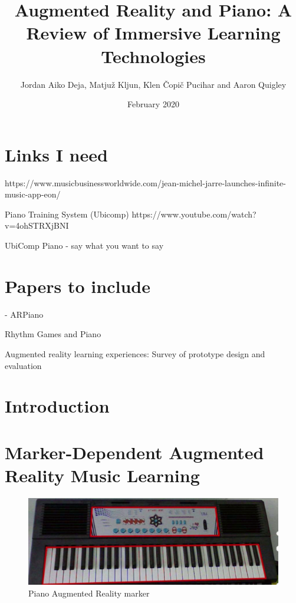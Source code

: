 \documentclass{article}
\title{Augmented Reality and Piano: A Review of Immersive Learning Technologies}
\author{Jordan Aiko Deja, Matjuž Kljun, Klen Čopič Pucihar and Aaron Quigley}
\date{February 2020}
\begin{document}
\maketitle

\section{Links I need}

https://www.musicbusinessworldwide.com/jean-michel-jarre-launches-infinite-music-app-eon/

Piano Training System (Ubicomp)
https://www.youtube.com/watch?v=4ohSTRXjBNI




UbiComp Piano - say what you want to say 
\cite{Weing:2013:PEI:2494091.2494113}


\section{Papers to include}



\cite{ARPiano-2018} - ARPiano 

Rhythm Games and Piano 

Augmented reality learning experiences: Survey of prototype design and evaluation

\section{Introduction}

\section{Marker-Dependent Augmented Reality Music Learning}

\begin{figure}
    \centering
    \includegraphics[width=15cm]{figures/pianomarker.png}
    \caption{Piano Augmented Reality marker}
    \label{fig:pianomarker}
\end{figure}
\end{document}
